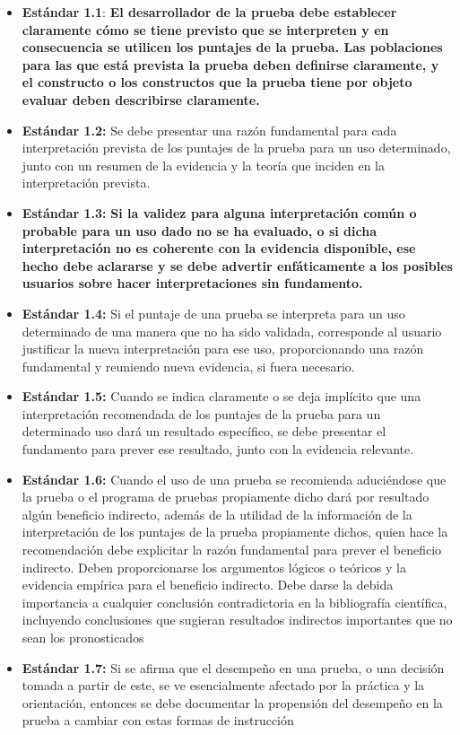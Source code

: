 \documentclass[
  letterpaper,
  DIV=11,
  numbers=noendperiod]{scrreprt}
\providecommand{\tightlist}{%
  \setlength{\itemsep}{0pt}\setlength{\parskip}{0pt}}
\begin{document}
\begin{itemize}
\tightlist
\item
  \textbf{Estándar 1.1}: \textbf{El desarrollador de la prueba debe
  establecer claramente cómo se tiene previsto que se interpreten y en
  consecuencia se utilicen los puntajes de la prueba. Las poblaciones
  para las que está prevista la prueba deben definirse claramente, y el
  constructo o los constructos que la prueba tiene por objeto evaluar
  deben describirse claramente.}
\item
  \textbf{Estándar 1.2:} Se debe presentar una razón fundamental para
  cada interpretación prevista de los puntajes de la prueba para un uso
  determinado, junto con un resumen de la evidencia y la teoría que
  inciden en la interpretación prevista.
\item
  \textbf{Estándar 1.3:} \textbf{Si la validez para alguna
  interpretación común o probable para un uso dado no se ha evaluado, o
  si dicha interpretación no es coherente con la evidencia disponible,
  ese hecho debe aclararse y se debe advertir enfáticamente a los
  posibles usuarios sobre hacer interpretaciones sin fundamento.}
\item
  \textbf{Estándar 1.4:} Si el puntaje de una prueba se interpreta para
  un uso determinado de una manera que no ha sido validada, corresponde
  al usuario justificar la nueva interpretación para ese uso,
  proporcionando una razón fundamental y reuniendo nueva evidencia, si
  fuera necesario.
\item
  \textbf{Estándar 1.5:} Cuando se indica claramente o se deja implícito
  que una interpretación recomendada de los puntajes de la prueba para
  un determinado uso dará un resultado específico, se debe presentar el
  fundamento para prever ese resultado, junto con la evidencia
  relevante.
\item
  \textbf{Estándar 1.6:} Cuando el uso de una prueba se recomienda
  aduciéndose que la prueba o el programa de pruebas propiamente dicho
  dará por resultado algún beneficio indirecto, además de la utilidad de
  la información de la interpretación de los puntajes de la prueba
  propiamente dichos, quien hace la recomendación debe explicitar la
  razón fundamental para prever el beneficio indirecto. Deben
  proporcionarse los argumentos lógicos o teóricos y la evidencia
  empírica para el beneficio indirecto. Debe darse la debida importancia
  a cualquier conclusión contradictoria en la bibliografía científica,
  incluyendo conclusiones que sugieran resultados indirectos importantes
  que no sean los pronosticados
\item
  \textbf{Estándar 1.7:} Si se afirma que el desempeño en una prueba, o
  una decisión tomada a partir de este, se ve esencialmente afectado por
  la práctica y la orientación, entonces se debe documentar la
  propensión del desempeño en la prueba a cambiar con estas formas de
  instrucción
\end{itemize}
\end{document}
